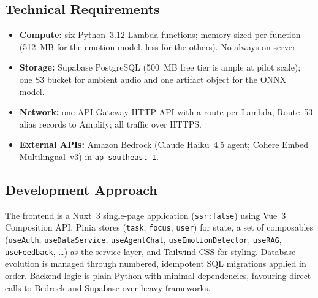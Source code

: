 \documentclass[a4paper,11pt]{article}
\begin{document}
	\subsection{Technical Requirements}
	\begin{itemize}
		\item \textbf{Compute:} six Python~3.12 Lambda functions; memory sized per function
		      (512~MB for the emotion model, less for the others). No always-on server.
		\item \textbf{Storage:} Supabase PostgreSQL (500~MB free tier is ample at pilot scale);
		      one S3 bucket for ambient audio and one artifact object for the ONNX model.
		\item \textbf{Network:} one API Gateway HTTP API with a route per Lambda; Route~53 alias
		      records to Amplify; all traffic over HTTPS.
		\item \textbf{External APIs:} Amazon Bedrock (Claude Haiku~4.5 agent; Cohere Embed
		      Multilingual~v3) in \texttt{ap-southeast-1}.
	\end{itemize}

	\subsection{Development Approach}
	The frontend is a Nuxt~3 single-page application (\texttt{ssr:false}) using Vue~3
	Composition API, Pinia stores (\texttt{task}, \texttt{focus}, \texttt{user}) for state, a
	set of composables (\texttt{useAuth}, \texttt{useDataService}, \texttt{useAgentChat},
	\texttt{useEmotionDetector}, \texttt{useRAG}, \texttt{useFeedback}, \dots) as the service
	layer, and Tailwind CSS for styling. Database evolution is managed through numbered,
	idempotent SQL migrations applied in order. Backend logic is plain Python with minimal
	dependencies, favouring direct calls to Bedrock and Supabase over heavy frameworks.
\end{document}
